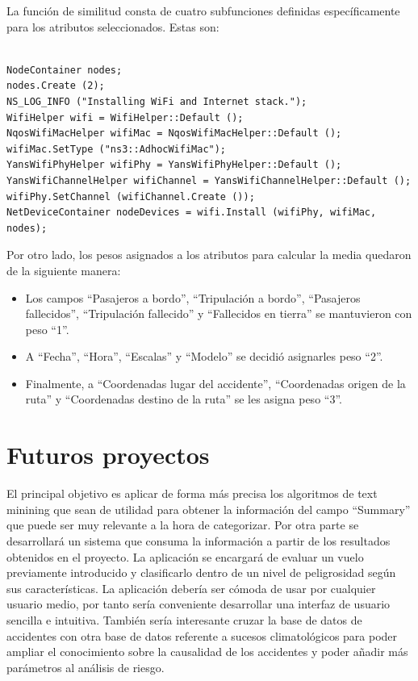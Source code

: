 \documentclass[a4paper,10pt]{article}
\begin{document}
\singlespacing
La funci\'on de similitud consta de cuatro subfunciones definidas espec\'ificamente para los atributos seleccionados. Estas son:

\begin{lstlisting}[style=C]

NodeContainer nodes;
nodes.Create (2);
NS_LOG_INFO ("Installing WiFi and Internet stack.");
WifiHelper wifi = WifiHelper::Default ();
NqosWifiMacHelper wifiMac = NqosWifiMacHelper::Default ();
wifiMac.SetType ("ns3::AdhocWifiMac");
YansWifiPhyHelper wifiPhy = YansWifiPhyHelper::Default ();
YansWifiChannelHelper wifiChannel = YansWifiChannelHelper::Default ();
wifiPhy.SetChannel (wifiChannel.Create ());
NetDeviceContainer nodeDevices = wifi.Install (wifiPhy, wifiMac, nodes);
\end{lstlisting}


\singlespacing
Por otro lado, los pesos asignados a los atributos para calcular la media quedaron de la siguiente manera:
\begin{itemize}
\item Los campos ``Pasajeros a bordo'', ``Tripulaci\'on a bordo'', ``Pasajeros fallecidos'', ``Tripulaci\'on fallecido'' y ``Fallecidos en tierra'' se mantuvieron con peso ``1''.

\item A ``Fecha'', ``Hora'', ``Escalas'' y ``Modelo'' se decidi\'o asignarles peso ``2''.

\item Finalmente, a ``Coordenadas lugar del accidente'', ``Coordenadas origen de la ruta'' y ``Coordenadas destino de la ruta'' se les asigna peso ``3''.

\end{itemize}
\pagebreak
\section{Futuros proyectos}
El principal objetivo es aplicar de forma m\'as precisa los algoritmos de text minining que sean de utilidad para obtener la informaci\'on del campo ``Summary'' que puede ser muy relevante a la hora de categorizar.
\singlespacing
Por otra parte se desarrollar\'a un sistema que consuma la informaci\'on a partir de los resultados obtenidos en el proyecto. La aplicaci\'on se encargar\'a de evaluar un vuelo previamente introducido y clasificarlo dentro de un nivel de peligrosidad seg\'un sus caracter\'isticas. La aplicaci\'on deber\'ia ser c\'omoda de usar por cualquier usuario medio, por tanto ser\'ia conveniente desarrollar una interfaz de usuario sencilla e intuitiva.
\singlespacing
Tambi\'en ser\'ia interesante cruzar la base de datos de accidentes con otra base de datos referente a sucesos climatol\'ogicos para poder ampliar el conocimiento sobre la causalidad de los accidentes y poder a\~nadir m\'as par\'ametros al an\'alisis de riesgo.
\end{document}
